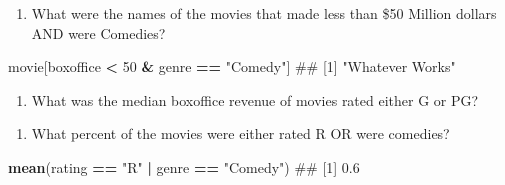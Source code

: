 \documentclass[]{book}
\newenvironment{Shaded}{\begin{snugshade}}{\end{snugshade}}
\newcommand{\KeywordTok}[1]{\textcolor[rgb]{0.13,0.29,0.53}{\textbf{#1}}}
\newcommand{\DecValTok}[1]{\textcolor[rgb]{0.00,0.00,0.81}{#1}}
\newcommand{\StringTok}[1]{\textcolor[rgb]{0.31,0.60,0.02}{#1}}
\newcommand{\CommentTok}[1]{\textcolor[rgb]{0.56,0.35,0.01}{\textit{#1}}}
\newcommand{\OperatorTok}[1]{\textcolor[rgb]{0.81,0.36,0.00}{\textbf{#1}}}
\newcommand{\NormalTok}[1]{#1}
\providecommand{\tightlist}{%
  \setlength{\itemsep}{0pt}\setlength{\parskip}{0pt}}
\theoremstyle{definition}
\theoremstyle{definition}
\theoremstyle{remark}
\begin{document}
\begin{enumerate}
\def\labelenumi{\arabic{enumi}.}
\setcounter{enumi}{7}
\tightlist
\item
  What were the names of the movies that made less than \$50 Million
  dollars AND were Comedies?
\end{enumerate}

\begin{Shaded}
\begin{Highlighting}[]
\NormalTok{movie[boxoffice }\OperatorTok{<}\StringTok{ }\DecValTok{50} \OperatorTok{&}\StringTok{ }\NormalTok{genre }\OperatorTok{==}\StringTok{ "Comedy"}\NormalTok{]}
\NormalTok{## [1] "Whatever Works"}
\end{Highlighting}
\end{Shaded}

\begin{enumerate}
\def\labelenumi{\arabic{enumi}.}
\setcounter{enumi}{8}
\tightlist
\item
  What was the median boxoffice revenue of movies rated either G or PG?
\end{enumerate}

\begin{Shaded}
\end{Shaded}

\begin{enumerate}
\def\labelenumi{\arabic{enumi}.}
\setcounter{enumi}{9}
\tightlist
\item
  What percent of the movies were either rated R OR were comedies?
\end{enumerate}

\begin{Shaded}
\begin{Highlighting}[]
\KeywordTok{mean}\NormalTok{(rating }\OperatorTok{==}\StringTok{ "R"} \OperatorTok{|}\StringTok{ }\NormalTok{genre }\OperatorTok{==}\StringTok{ "Comedy"}\NormalTok{)}
\NormalTok{## [1] 0.6}
\end{Highlighting}
\end{Shaded}
\end{document}
